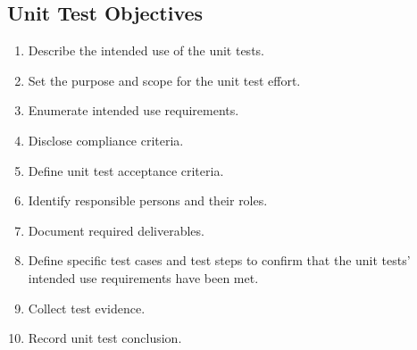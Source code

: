 \subsection{Unit Test Objectives}
\begin{enumerate}
  \item Describe the intended use of the unit tests.
  \item Set the purpose and scope for the unit test effort.
  \item Enumerate intended use requirements.
  \item Disclose compliance criteria.
  \item Define unit test acceptance criteria.
  \item Identify responsible persons and their roles.
  \item Document required deliverables.
  \item Define specific test cases and test steps to confirm that the unit
    tests' intended use requirements have been met.
  \item Collect test evidence.
  \item Record unit test conclusion.
\end{enumerate}
